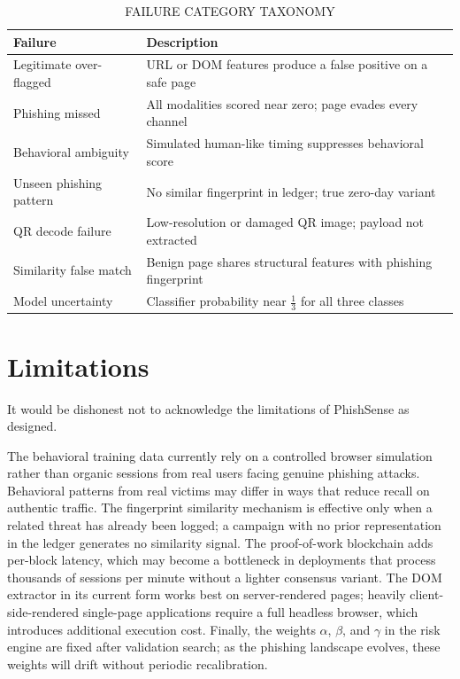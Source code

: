 \documentclass[conference]{IEEEtran}
\begin{document}
\begin{table}[!t]
\caption{FAILURE CATEGORY TAXONOMY}
\label{tab:fail}
\centering
\scriptsize
\setlength{\tabcolsep}{3pt}
\begin{tabularx}{\columnwidth}{|>{\raggedright\arraybackslash}p{}|>{\raggedright\arraybackslash}X|}
\hline
\textbf{Failure} & \textbf{Description} \\ \hline
Legitimate over-flagged & URL or DOM features produce a false positive on a safe page \\ \hline
Phishing missed         & All modalities scored near zero; page evades every channel \\ \hline
Behavioral ambiguity    & Simulated human-like timing suppresses behavioral score \\ \hline
Unseen phishing pattern & No similar fingerprint in ledger; true zero-day variant \\ \hline
QR decode failure       & Low-resolution or damaged QR image; payload not extracted \\ \hline
Similarity false match  & Benign page shares structural features with phishing fingerprint \\ \hline
Model uncertainty       & Classifier probability near $\tfrac{1}{3}$ for all three classes \\ \hline
\end{tabularx}
\end{table}

\section{Limitations} \label{sec:limits}

It would be dishonest not to acknowledge the limitations of PhishSense as designed.

The behavioral training data currently rely on a controlled browser simulation rather than
organic sessions from real users facing genuine phishing attacks.
Behavioral patterns from real victims may differ in ways that reduce recall on authentic traffic.
The fingerprint similarity mechanism is effective only when a related threat has already been
logged; a campaign with no prior representation in the ledger generates no similarity signal.
The proof-of-work blockchain adds per-block latency, which may become a bottleneck in deployments
that process thousands of sessions per minute without a lighter consensus variant.
The DOM extractor in its current form works best on server-rendered pages; heavily
client-side-rendered single-page applications require a full headless browser, which introduces
additional execution cost.
Finally, the weights $\alpha$, $\beta$, and $\gamma$ in the risk engine are fixed after validation
search; as the phishing landscape evolves, these weights will drift without periodic recalibration.
\end{document}
